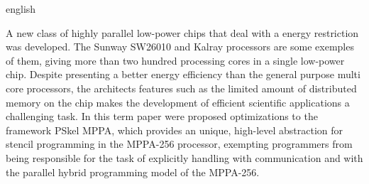 \begin{otherlanguage*}{english}
\begin{resumo}[Abstract]

  A new class of highly parallel low-power chips that deal with a energy restriction was developed. The Sunway SW26010 and Kalray processors are some exemples of them, giving more than two hundred processing cores in a single low-power chip. Despite presenting a better energy efficiency than the general purpose multi core processors, the architects features such as the limited amount of distributed memory on the chip makes the development of efficient scientific applications a challenging task. In this term paper were proposed optimizations to the framework PSkel MPPA, which provides an unique, high-level abstraction for stencil programming in the MPPA-256 processor, exempting programmers from being responsible for the task of explicitly handling with communication and with the parallel hybrid programming model of the MPPA-256.


\end{resumo}
\end{otherlanguage*}











